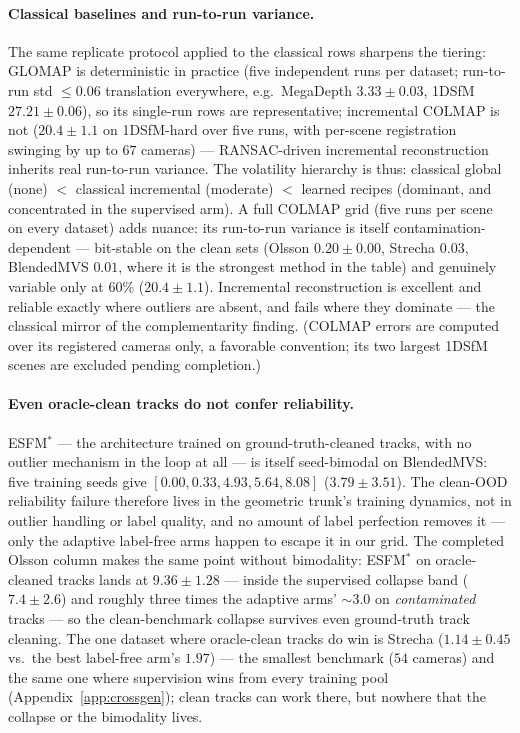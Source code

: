 \documentclass[10pt,twocolumn,letterpaper]{article}
\begin{document}
\paragraph{Classical baselines and run-to-run variance.} The same replicate protocol
applied to the classical rows sharpens the tiering: GLOMAP is deterministic in practice
(five independent runs per dataset; run-to-run std $\le 0.06$ translation everywhere,
e.g.\ MegaDepth $3.33\pm0.03$, 1DSfM $27.21\pm0.06$), so its single-run rows are
representative; incremental COLMAP is not ($20.4\pm1.1$ on 1DSfM-hard over five runs,
with per-scene registration swinging by up to $67$ cameras) --- RANSAC-driven
incremental reconstruction inherits real run-to-run variance. The volatility hierarchy
is thus: classical global (none) $<$ classical incremental (moderate) $<$ learned
recipes (dominant, and concentrated in the supervised arm). A full COLMAP grid (five runs per scene on every dataset) adds nuance: its
run-to-run variance is itself contamination-dependent --- bit-stable on the clean sets
(Olsson $0.20\pm0.00$, Strecha $0.03$, BlendedMVS $0.01$, where it is the strongest
method in the table) and genuinely variable only at $60\%$ ($20.4\pm1.1$). Incremental
reconstruction is excellent and reliable exactly where outliers are absent, and fails
where they dominate --- the classical mirror of the complementarity finding. (COLMAP
errors are computed over its registered cameras only, a favorable convention; its
two largest 1DSfM scenes are excluded pending completion.)

\paragraph{Even oracle-clean tracks do not confer reliability.} ESFM$^{\ast}$ ---
the architecture trained on ground-truth-cleaned tracks, with no outlier mechanism in
the loop at all --- is itself seed-bimodal on BlendedMVS: five training seeds give
$[0.00, 0.33, 4.93, 5.64, 8.08]$ ($3.79\pm3.51$). The clean-OOD reliability failure
therefore lives in the geometric trunk's training dynamics, not in outlier handling or
label quality, and no amount of label perfection removes it --- only the adaptive
label-free arms happen to escape it in our grid. The completed Olsson column makes the
same point without bimodality: ESFM$^{\ast}$ on oracle-cleaned tracks lands at
$9.36\pm1.28$ --- inside the supervised collapse band ($7.4\pm2.6$) and roughly three
times the adaptive arms' $\sim\!3.0$ on \emph{contaminated} tracks --- so the
clean-benchmark collapse survives even ground-truth track cleaning. The one dataset
where oracle-clean tracks do win is Strecha ($1.14\pm0.45$ vs.\ the best label-free arm's
$1.97$) --- the smallest benchmark ($54$ cameras) and the same one where supervision wins
from every training pool (Appendix~\ref{app:crossgen}); clean tracks can work there, but
nowhere that the collapse or the bimodality lives.
\end{document}
